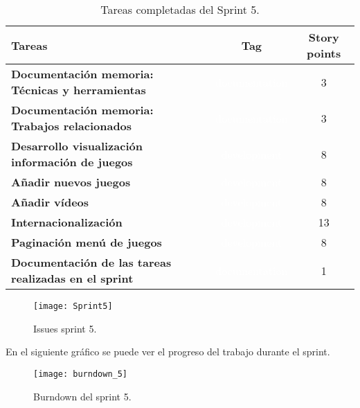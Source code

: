\begin{table}[ht!]
    \centering
    \resizebox{15cm}{!} {
    \begin{tabular}{|l|c|c|}
    \hline
    \rowcolor[rgb]{0.99,0.93,0.93}
    \textbf{Tareas}     &\textbf{Tag}     & \textbf{Story points} \\ \hline
    \textbf{Documentación memoria: Técnicas y herramientas}          &\cellcolor[rgb]{0.0,0.33,0.71}\textcolor{white}{documentation}      &3 \\ \hline 
    \textbf{Documentación memoria: Trabajos relacionados}          &\cellcolor[rgb]{0.0,0.33,0.71}\textcolor{white}{documentation}      &3 \\ \hline 
    \textbf{Desarrollo visualización información de juegos}         &\cellcolor[rgb]{0.99,0.83,0.93}\textcolor{white}{development}      &8 \\ \hline
     \textbf{Añadir nuevos juegos}         &\cellcolor[rgb]{0.99,0.83,0.93}\textcolor{white}{development}      &8 \\ \hline 
    \textbf{Añadir vídeos}         &\cellcolor[rgb]{0.99,0.83,0.93}\textcolor{white}{development}      &8 \\ \hline 
    \textbf{Internacionalización}         &\cellcolor[rgb]{0.99,0.83,0.93}\textcolor{white}{development}      &13 \\ \hline 
    \textbf{Paginación menú de juegos}         &\cellcolor[rgb]{0.99,0.83,0.93}\textcolor{white}{development}      &8 \\ \hline 
    \textbf{Documentación de las tareas realizadas en el sprint}         &\cellcolor[rgb]{0.0,0.33,0.71}\textcolor{white}{documentation}      &1 \\ \hline 
    \end{tabular}}
    \caption{Tareas completadas del Sprint 5.}
    \label{tab:my_label}
\end{table}

\begin{figure}[htb]
    \centering
    \texttt{[image: Sprint5]}
    \caption{Issues sprint 5.}
    \label{fig:Sprint5}
\end{figure}

\newpage
En el siguiente gráfico se puede ver el progreso del trabajo durante el sprint.
\begin{figure}[htb]
    \centering
    \texttt{[image: burndown\_5]}
    \caption{Burndown del sprint 5.}
    \label{fig:burndown_5}
\end{figure}

